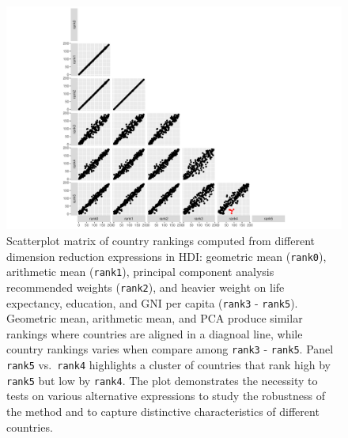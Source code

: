 \documentclass[
]{article}
\begin{document}
\begin{figure}

{\centering \includegraphics{paper_files/figure-pdf/fig-hdi-expr-1.pdf}

}

\caption{\label{fig-hdi-expr}Scatterplot matrix of country rankings
computed from different dimension reduction expressions in HDI:
geometric mean (\texttt{rank0}), arithmetic mean (\texttt{rank1}),
principal component analysis recommended weights (\texttt{rank2}), and
heavier weight on life expectancy, education, and GNI per capita
(\texttt{rank3} - \texttt{rank5}). Geometric mean, arithmetic mean, and
PCA produce similar rankings where countries are aligned in a diagnoal
line, while country rankings varies when compare among \texttt{rank3} -
\texttt{rank5}. Panel \texttt{rank5} vs.~\texttt{rank4} highlights a
cluster of countries that rank high by \texttt{rank5} but low by
\texttt{rank4}. The plot demonstrates the necessity to tests on various
alternative expressions to study the robustness of the method and to
capture distinctive characteristics of different countries.}

\end{figure}
\end{document}
